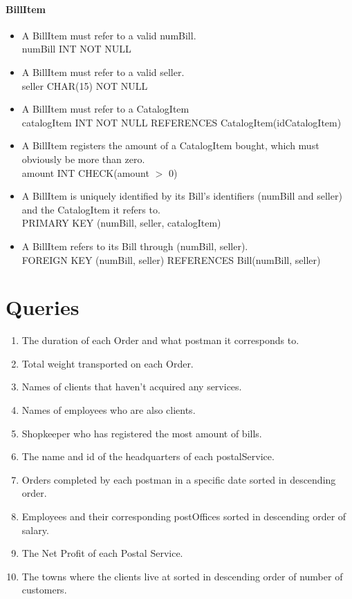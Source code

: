 \documentclass{report}[a4paper]
\theoremstyle{remark}
\begin{document}
\subsubsection{BillItem}
\begin{itemize}
    \item A BillItem must refer to a valid numBill. \\ numBill INT NOT NULL
    \item A BillItem must refer to a valid seller. \\ seller CHAR(15) NOT NULL
    \item A BillItem must refer to a CatalogItem \\ catalogItem INT NOT NULL REFERENCES CatalogItem(idCatalogItem)
    \item A BillItem registers the amount of a CatalogItem bought, which must obviously be more than zero. \\ amount INT CHECK(amount $>$ 0)
    \item A BillItem is uniquely identified by its Bill's identifiers (numBill and seller) and the CatalogItem it refers to. \\ PRIMARY KEY (numBill, seller, catalogItem)
    \item A BillItem refers to its Bill through (numBill, seller). \\ FOREIGN KEY (numBill, seller) REFERENCES Bill(numBill, seller)
\end{itemize}

\chapter{Queries}

\begin{enumerate}
    \item The duration of each Order and what postman it corresponds to.
    \item Total weight transported on each Order.
    \item Names of clients that haven't acquired any services.
    \item Names of employees who are also clients.
    \item Shopkeeper who has registered the most amount of bills.
    \item The name and id of the headquarters of each postalService.
    \item Orders completed by each postman in a specific date sorted in descending order.
    \item Employees and their corresponding postOffices sorted in descending order of salary.
    \item The Net Profit of each Postal Service.
    \item The towns where the clients live at sorted in descending order of number of customers.
\end{enumerate}
\end{document}
